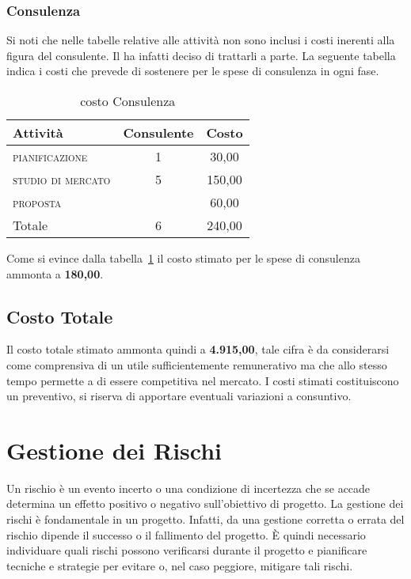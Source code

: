 	
\subsubsection*{Consulenza}

Si noti che nelle tabelle relative alle attività non sono inclusi i costi inerenti alla figura del consulente. Il  ha infatti deciso di trattarli a parte. La seguente tabella indica i costi che \team prevede di sostenere per le spese di consulenza in ogni fase.
	
\begin{table}[!h]
\centering
\begin{tabular}{|l|c|c|}
\hline
\textbf{Attività}& \textbf{Consulente} & \textbf{Costo}  \\           
\hline
\scshape{}pianificazione		& 1& \text{\euro} 30,00 \\
\scshape{}studio di mercato 	& 5& \text{\euro} 150,00 \\
\scshape{}proposta 			& &	\text{\euro} 60,00 \\	
\hline
Totale				& 6& \text{\euro} 240,00 \\	
\hline
\end{tabular}
\caption{costo Consulenza}\label{tab:consulenza}
\end{table}

Come si evince dalla tabella~\ref{tab:consulenza} il costo stimato per le spese di consulenza ammonta a \textbf{\text{\euro} 180,00}.

\subsection{Costo Totale}

Il costo totale stimato ammonta quindi a \textbf{ \text{\euro} 4.915,00}, tale cifra è da considerarsi come comprensiva di un utile sufficientemente remunerativo ma che allo stesso tempo permette a \team di essere competitiva nel mercato. I costi stimati costituiscono un preventivo, \team si riserva di apportare eventuali variazioni a consuntivo.

\section{Gestione dei Rischi}
Un rischio è un evento incerto o una condizione di incertezza che se accade determina un effetto positivo o negativo sull'obiettivo di progetto.
La gestione dei rischi è fondamentale in un progetto. Infatti, da una gestione corretta o errata del rischio dipende il successo o il fallimento del progetto.
È quindi necessario individuare quali rischi possono verificarsi durante il progetto e pianificare tecniche e strategie per evitare o, nel caso peggiore, mitigare tali rischi.

